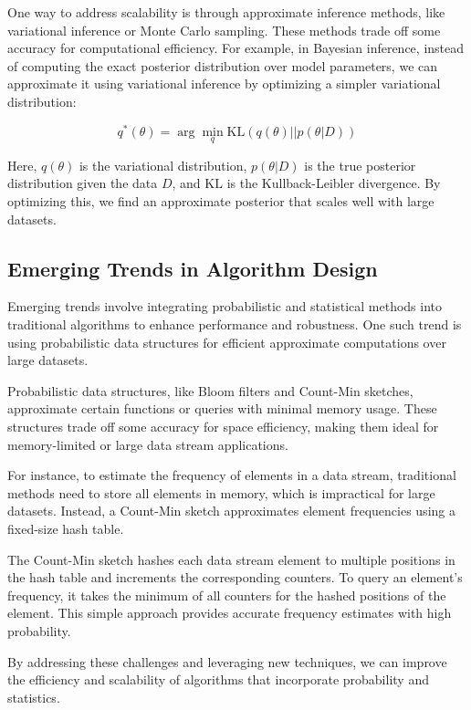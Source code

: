 \documentclass[12pt]{book} %
\begin{document}
One way to address scalability is through approximate inference methods, like variational inference or Monte Carlo sampling. These methods trade off some accuracy for computational efficiency. For example, in Bayesian inference, instead of computing the exact posterior distribution over model parameters, we can approximate it using variational inference by optimizing a simpler variational distribution:

\[
q^*(\theta) = \arg \min_q \text{KL}(q(\theta) || p(\theta | D))
\]

Here, \(q(\theta)\) is the variational distribution, \(p(\theta | D)\) is the true posterior distribution given the data \(D\), and \(\text{KL}\) is the Kullback-Leibler divergence. By optimizing this, we find an approximate posterior that scales well with large datasets.

\subsection{Emerging Trends in Algorithm Design}

Emerging trends involve integrating probabilistic and statistical methods into traditional algorithms to enhance performance and robustness. One such trend is using probabilistic data structures for efficient approximate computations over large datasets.

Probabilistic data structures, like Bloom filters and Count-Min sketches, approximate certain functions or queries with minimal memory usage. These structures trade off some accuracy for space efficiency, making them ideal for memory-limited or large data stream applications.

For instance, to estimate the frequency of elements in a data stream, traditional methods need to store all elements in memory, which is impractical for large datasets. Instead, a Count-Min sketch approximates element frequencies using a fixed-size hash table.

The Count-Min sketch hashes each data stream element to multiple positions in the hash table and increments the corresponding counters. To query an element's frequency, it takes the minimum of all counters for the hashed positions of the element. This simple approach provides accurate frequency estimates with high probability.

By addressing these challenges and leveraging new techniques, we can improve the efficiency and scalability of algorithms that incorporate probability and statistics.
\end{document}
